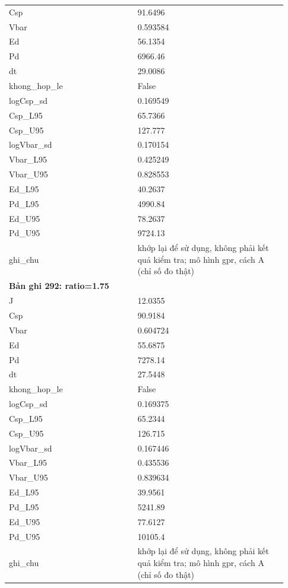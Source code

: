 \begin{longtable}{p{0.43\linewidth}p{0.50\linewidth}}
Csp & 91.6496 \\
Vbar & 0.593584 \\
Ed & 56.1354 \\
Pd & 6966.46 \\
dt & 29.0086 \\
khong\_\allowbreak hop\_\allowbreak le & False \\
logCsp\_\allowbreak sd & 0.169549 \\
Csp\_\allowbreak L95 & 65.7366 \\
Csp\_\allowbreak U95 & 127.777 \\
logVbar\_\allowbreak sd & 0.170154 \\
Vbar\_\allowbreak L95 & 0.425249 \\
Vbar\_\allowbreak U95 & 0.828553 \\
Ed\_\allowbreak L95 & 40.2637 \\
Pd\_\allowbreak L95 & 4990.84 \\
Ed\_\allowbreak U95 & 78.2637 \\
Pd\_\allowbreak U95 & 9724.13 \\
ghi\_\allowbreak chu & khớp lại để sử dụng, không phải kết quả kiểm tra; mô hình gpr, cách A (chỉ số đo thật) \\
\midrule
\multicolumn{2}{p{0.95\linewidth}}{\textbf{Bản ghi 292: ratio=1.75}} \\
J & 12.0355 \\
Csp & 90.9184 \\
Vbar & 0.604724 \\
Ed & 55.6875 \\
Pd & 7278.14 \\
dt & 27.5448 \\
khong\_\allowbreak hop\_\allowbreak le & False \\
logCsp\_\allowbreak sd & 0.169375 \\
Csp\_\allowbreak L95 & 65.2344 \\
Csp\_\allowbreak U95 & 126.715 \\
logVbar\_\allowbreak sd & 0.167446 \\
Vbar\_\allowbreak L95 & 0.435536 \\
Vbar\_\allowbreak U95 & 0.839634 \\
Ed\_\allowbreak L95 & 39.9561 \\
Pd\_\allowbreak L95 & 5241.89 \\
Ed\_\allowbreak U95 & 77.6127 \\
Pd\_\allowbreak U95 & 10105.4 \\
ghi\_\allowbreak chu & khớp lại để sử dụng, không phải kết quả kiểm tra; mô hình gpr, cách A (chỉ số đo thật) \\

\end{longtable}
